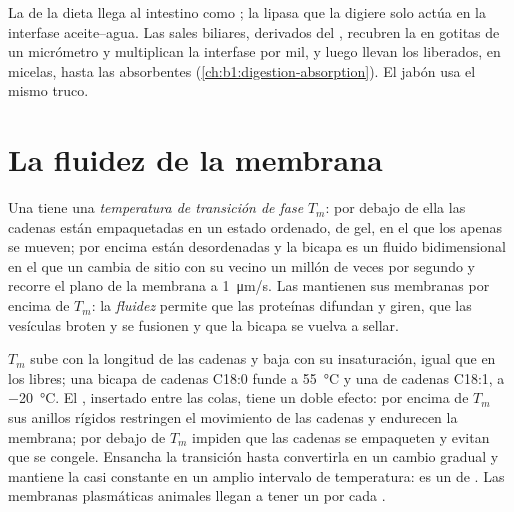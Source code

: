 \begin{example}\label{ex:b1:lipids:bile}
La  de la dieta llega al intestino como ; la lipasa que la
digiere solo actúa en la interfase aceite--agua. Las sales biliares,
derivados  del , recubren la  en gotitas de un
micrómetro y multiplican la interfase por mil, y luego llevan los  liberados, en micelas, hasta las  absorbentes
(\cref{ch:b1:digestion-absorption}). El jabón usa el mismo truco.
\end{example}

\section{La fluidez de la membrana}

\begin{definition}\label{def:b1:lipids:fluidity}
Una  tiene una \emph{temperatura de transición de
fase} $T_m$: por debajo de ella las
cadenas están empaquetadas en un estado ordenado, de gel, en el que los
 apenas se mueven; por encima están desordenadas y la bicapa es un
fluido bidimensional en el que un  cambia de sitio con su vecino un
millón de veces por segundo y recorre el plano de la membrana a
\qty{1}{\micro m/s}. Las  mantienen sus membranas por encima de
$T_m$: la \emph{fluidez} permite que las
proteínas difundan y giren, que las vesículas broten y se fusionen y que la
bicapa se vuelva a sellar.
\end{definition}

\begin{proposition}\label{prop:b1:lipids:fluidityfactors}
$T_m$ sube con la longitud de las cadenas y baja con su insaturación, igual
que en los  libres; una bicapa de cadenas C18:0 funde a
\qty{55}{\celsius} y una de cadenas C18:1, a \qty{-20}{\celsius}. El
, insertado entre las colas, tiene un doble efecto: por encima de
$T_m$ sus anillos rígidos restringen el movimiento de las cadenas y
endurecen la membrana; por debajo de $T_m$ impiden que las cadenas se
empaqueten y evitan que se congele. Ensancha la transición hasta convertirla
en un cambio gradual y mantiene la  casi constante en un amplio
intervalo de temperatura: es un  de . Las membranas plasmáticas
animales llegan a tener un  por cada .
\end{proposition}

